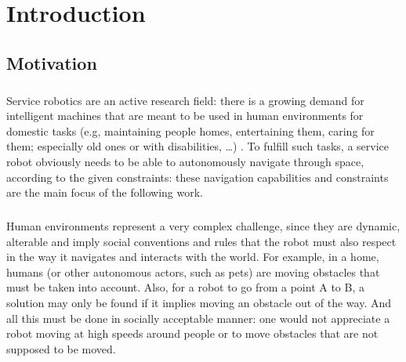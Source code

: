
\chapter{Introduction} %

\label{Chapter1} %


\section{Motivation}

\paragraph{} Service robotics are an active research field: there is a growing demand for intelligent machines that are meant to be used in human environments for domestic tasks (e.g, maintaining people homes, entertaining them, caring for them; especially old ones or with disabilities, \dots) . To fulfill such tasks, a service robot obviously needs to be able to autonomously navigate through space, according to the given constraints: these navigation capabilities and constraints are the main focus of the following work.

\paragraph{} Human environments represent a very complex challenge, since they are dynamic, alterable and imply social conventions and rules that the robot must also respect in the way it navigates and interacts with the world. For example, in a home, humans (or other autonomous actors, such as pets) are moving obstacles that must be taken into account. Also, for a robot to go from a point A to B, a solution may only be found if it implies moving an obstacle out of the way. And all this must be done in socially acceptable manner: one would not appreciate a robot moving at high speeds around people or to move obstacles that are not supposed to be moved.

